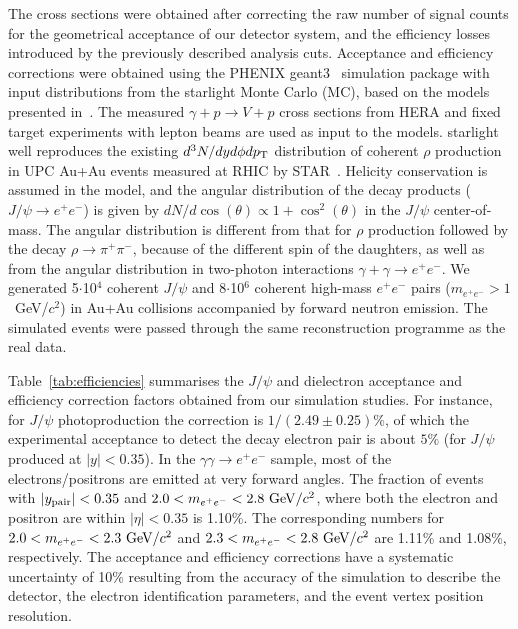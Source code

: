 \documentclass[dvipdfm]{elsart}
\providecommand{\jpsi}{J/\psi}
\begin{document}
The cross sections were obtained after correcting the raw number of signal 
counts for the geometrical acceptance of our detector system, and the 
efficiency losses introduced by the previously described analysis cuts. 
Acceptance and efficiency corrections were obtained using the PHENIX {\sc 
geant3}~\cite{geant} simulation package with input distributions from the 
{\sc starlight} Monte Carlo (MC), based on the models presented 
in~\cite{Baltz:2002pp,Klein:1999qj,Nystrand:2004vn}. The measured $\gamma + p 
\rightarrow V+p$ cross sections from HERA and fixed target experiments with 
lepton beams are used as input to the models. {\sc starlight} well reproduces 
the existing $d^3N/dyd\phi dp_{\rm T}$ distribution of coherent $\rho$ production 
in UPC Au+Au events measured at RHIC by 
STAR~\cite{Adler:2002sc,Abelev:2007nb}. Helicity conservation is assumed in 
the model, and the angular distribution of the decay products ($\jpsi 
\rightarrow e^+ e^-$) is given by $dN/d\cos(\theta) \propto 1 + 
\cos^2(\theta)$ in the $\jpsi$ center-of-mass. The angular distribution is 
different from that for $\rho$ production followed by the decay $\rho 
\rightarrow \pi^+ \pi^-$, because of the different spin of the daughters, as 
well as from the angular distribution in two-photon interactions $\gamma + 
\gamma \rightarrow e^+ e^-$. We generated 5$\cdot$10$^4$ coherent $\jpsi$ and 
8$\cdot$10$^6$ coherent high-mass $e^+e^-$ pairs ($m_{e^+e^-}>1$~GeV/$c^2$) 
in Au+Au collisions accompanied by forward neutron emission.  The simulated 
events were passed through the same reconstruction programme as the real 
data.

Table~\ref{tab:efficiencies} summarises the $\jpsi$ and dielectron acceptance 
and efficiency correction factors obtained from our simulation studies. For 
instance, for $\jpsi$ photoproduction the correction is $1/(2.49 \pm 0.25) 
\%$, of which the experimental acceptance to detect the decay electron pair 
is about $5\%$ (for $\jpsi$ produced at $|y|<0.35$). 
In the $\gamma \gamma \rightarrow e^+e^-$ sample, most of the
electrons/positrons are emitted at very forward angles. The fraction of events
with $|y_{\rm pair}|<0.35$ and 
$2.0<m_{e^+e^-}<2.8~{\rm GeV}/c^2$, 
where both the electron and
positron are within $|\eta|<0.35$ is 1.10\%. 
The corresponding numbers for
$2.0<m_{e^+e^-}<2.3~{\rm GeV}/c^2$ and 
$2.3<m_{e^+e^-}<2.8~{\rm GeV}/c^2$ are 1.11\% and 1.08\%, respectively. 
The acceptance and efficiency corrections have a systematic uncertainty of 10\%
resulting from the accuracy of the simulation to describe the detector, the
electron identification parameters, and the event vertex position resolution.
\end{document}
